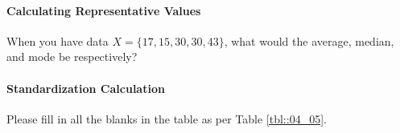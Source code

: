 \documentclass{ltjbook}
\begin{document}
\paragraph{Calculating Representative Values} When you have data $X = \{17 , 15, 30 , 30, 43 \}$, what would the average, median, and mode be respectively?
\paragraph{Standardization Calculation} Please fill in all the blanks in the table as per Table \ref{tbl::04_05}.


\end{document}
